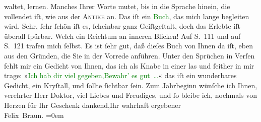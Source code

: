                waltet, lernen. Manches Ihrer Worte mutet, bis in die Sprache hinein, die vollendet
               iſt, wie aus der \textsc{Antike} an.\pend
           \pstart
           Das iſt ein \textcolor{green}{Buch}{}, das mich lange
               begleiten wird. Sehr, ſehr ſchön iſt es, ſcheinbar ganz Geiſtgeſtalt, doch das
               Erlebte iſt überall ſpürbar. {\pb}Welch ein
               Reichtum an inneren Blicken! Auf S. 111 \label{K_L02494_1v}\label{K_L02494_1h} und auf
               S. 121 \label{K_L02494_2v}\label{K_L02494_2h} trafen mich ſelbst.\pend
           \pstart
           Es ist ſehr gut, daß dieſes Buch von Ihnen da iſt, eben aus den Gründen, die Sie in
               der Vorrede anführen. Unter den Sprüchen in Verſen fehlt mir ein Gedicht von Ihnen,
               das ich als Knabe in einer \label{K_L02494_3v}\label{K_L02494_3h} las und ſeither in mir trage:\pend
           \stanza{}»\textcolor{green}{Ich hab dir viel gegeben,}{}\newverse{}\textcolor{green}{Bewahr’ es gut {\dots}}{}«\stanzaend{}\pstart
           das iſt ein wunderbares Gedicht, ein Kryſtall, und ſollte ſichtbar ſein.\pend
           \pstart
           Zum Jahrbeginn wünſche ich Ihnen, verehrter Herr Doktor, viel Liebes und
               Freudiges, und ſo bleibe {\pb}ich, nochmals
               von Herzen für Ihr Geschenk dankend,\hspace*{1.5em}Ihr wahrhaft ergebener{\\[\baselineskip]}\spacefill\mbox{Felix Braun.}\pend
           \leftskip=0em{}\endnumbering{}  
      